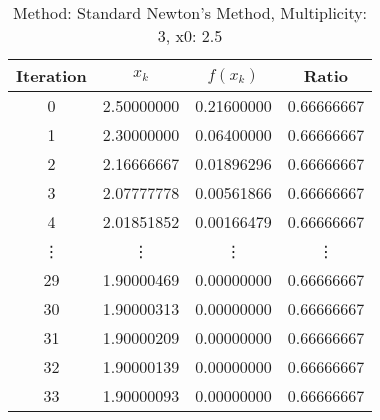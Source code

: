 \begin{table}
\centering
\caption{Method: Standard Newton's Method, Multiplicity: 3, x0: 2.5}
\label{tab:table_Standard_Newton's_Method_3_2_5}
\begin{tabular}{c c c c}
\toprule
Iteration &      $x_k$ &   $f(x_k)$ &      Ratio \\
\midrule
        0 & 2.50000000 & 0.21600000 & 0.66666667 \\
        1 & 2.30000000 & 0.06400000 & 0.66666667 \\
        2 & 2.16666667 & 0.01896296 & 0.66666667 \\
        3 & 2.07777778 & 0.00561866 & 0.66666667 \\
        4 & 2.01851852 & 0.00166479 & 0.66666667 \\
   \vdots &     \vdots &     \vdots &     \vdots \\
       29 & 1.90000469 & 0.00000000 & 0.66666667 \\
       30 & 1.90000313 & 0.00000000 & 0.66666667 \\
       31 & 1.90000209 & 0.00000000 & 0.66666667 \\
       32 & 1.90000139 & 0.00000000 & 0.66666667 \\
       33 & 1.90000093 & 0.00000000 & 0.66666667 \\
\bottomrule
\end{tabular}
\end{table}
